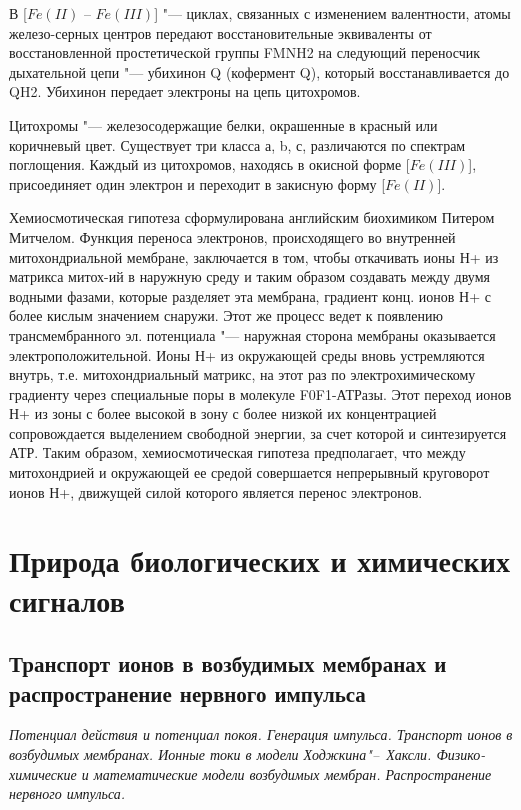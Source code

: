 \documentclass[12pt,a4paper,oneside]{book}
\begin{document}
В [$Fe(II)$ -- $Fe(III)$] "--- циклах, связанных с изменением валентности, атомы железо-серных центров передают восстановительные эквиваленты от восстановленной простетической группы FMNH2 на следующий переносчик дыхательной цепи "--- убихинон Q (кофермент Q), который восстанавливается до QH2. Убихинон передает электроны на цепь цитохромов.

Цитохромы "--- железосодержащие белки, окрашенные в красный или коричневый цвет. Существует три класса а, b, с, различаются по спектрам поглощения. Каждый из цитохромов, находясь в окисной форме [$Fe(III)$], присоединяет один электрон и переходит в закисную форму [$Fe(II)$].

Хемиосмотическая гипотеза сформулирована английским биохимиком Питером Митчелом. Функция переноса электронов, происходящего во внутренней митохондриальной мембране, заключается в том, чтобы откачивать ионы Н+ из матрикса митох-ий в наружную среду и таким образом создавать между двумя водными фазами, которые разделяет эта мембрана, градиент конц. ионов Н+ с более кислым значением снаружи. Этот же процесс ведет к появлению трансмембранного эл. потенциала "--- наружная сторона мембраны оказывается электроположительной. Ионы Н+ из окружающей среды вновь устремляются внутрь, т.е. митохондриальный матрикс, на этот раз по электрохимическому градиенту через специальные поры в молекуле F0F1-АТРазы. Этот переход ионов Н+ из зоны с более высокой в зону с более низкой их концентрацией сопровождается выделением свободной энергии, за счет которой и синтезируется АТР. Таким образом, хемиосмотическая гипотеза предполагает, что между митохондрией и окружающей ее средой совершается непрерывный круговорот ионов Н+, движущей силой которого является перенос электронов.



\chapter{Природа биологических и химических сигналов}

\section{Транспорт ионов в возбудимых мембранах и распространение нервного импульса}
{\it Потенциал действия и потенциал покоя. Генерация импульса. Транспорт ионов в возбудимых мембранах. Ионные токи в модели Ходжкина"--~Хаксли. Физико-химические и математические модели возбудимых мембран. Распространение нервного импульса.}
\end{document}
